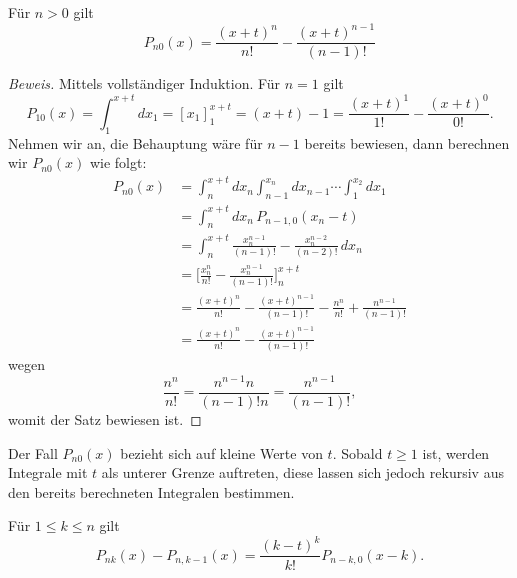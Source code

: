 \begin{satz}Für $n>0$ gilt
\begin{equation}
P_{n0}(x)=\frac{(x+t)^n}{n!}-\frac{(x+t)^{n-1}}{(n-1)!}
\end{equation}
\end{satz}
\begin{proof}[Beweis]
Mittels vollständiger Induktion.
Für $n=1$ gilt
\[
P_{10}(x)=\int_1^{x+t}dx_1=[x_1]_1^{x+t}=(x+t)-1=\frac{(x+t)^1}{1!}-\frac{(x+t)^0}{0!}.
\]
Nehmen wir an, die Behauptung wäre für $n-1$ bereits bewiesen, dann
berechnen wir $P_{n0}(x)$ wie folgt:
\begin{align*}
P_{n0}(x)
&=
\int_n^{x+t}dx_n\int_{n-1}^{x_n}dx_{n-1}\dotsi\int_1^{x_2}dx_1
\\
&=
\int_n^{x+t}dx_n\,P_{n-1,0}(x_n-t)
\\
&=
\int_n^{x+t}\frac{x_n^{n-1}}{(n-1)!}-\frac{x_n^{n-2}}{(n-2)!}\,dx_n
\\
&=
\biggl[\frac{x_n^n}{n!}-\frac{x_n^{n-1}}{(n-1)!}\biggr]_n^{x+t}
\\
&=
\frac{(x+t)^n}{n!}-\frac{(x+t)^{n-1}}{(n-1)!}
-\frac{n^n}{n!}+\frac{n^{n-1}}{(n-1)!}
\\
&=
\frac{(x+t)^n}{n!}-\frac{(x+t)^{n-1}}{(n-1)!}
\end{align*}
wegen
\[
\frac{n^n}{n!}=\frac{n^{n-1}n}{(n-1)! n}=\frac{n^{n-1}}{(n-1)!},
\]
womit der Satz bewiesen ist.
\end{proof}

Der Fall $P_{n0}(x)$ bezieht sich auf kleine Werte von $t$.
Sobald 
$t\ge 1$ ist, werden Integrale mit $t$ als unterer Grenze auftreten,
diese lassen sich jedoch rekursiv aus den bereits berechneten
Integralen bestimmen.

\begin{satz}\label{kn-rekursion}
Für $1\le k\le n$ gilt
\begin{equation}
P_{nk}(x)-P_{n,k-1}(x)
=
\frac{(k-t)^k}{k!}P_{n-k,0}(x-k).
\end{equation}
\end{satz}

